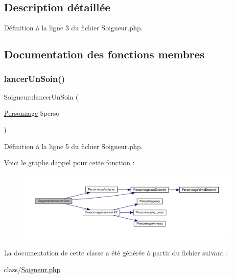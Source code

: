 \subsection{Description détaillée}


Définition à la ligne 3 du fichier Soigneur.\+php.



\subsection{Documentation des fonctions membres}
\mbox{\label{class_soigneur_ac68dd65c897e55dc77d354e79e79a52c}} 
\subsubsection{\texorpdfstring{lancer\+Un\+Soin()}{lancerUnSoin()}}
{\footnotesize\ttfamily Soigneur\+::lancer\+Un\+Soin (\begin{DoxyParamCaption}\item[{\mbox{\hyperlink{class_personnage}{Personnage}}}]{\$perso }\end{DoxyParamCaption})}



Définition à la ligne 5 du fichier Soigneur.\+php.

Voici le graphe d\textquotesingle{}appel pour cette fonction \+:\nopagebreak
\begin{figure}[H]
\begin{center}
\leavevmode
\includegraphics[width=350pt]{class_soigneur_ac68dd65c897e55dc77d354e79e79a52c_cgraph}
\end{center}
\end{figure}


La documentation de cette classe a été générée à partir du fichier suivant \+:\begin{DoxyCompactItemize}
\item 
class/\mbox{\hyperlink{_soigneur_8php}{Soigneur.\+php}}\end{DoxyCompactItemize}
